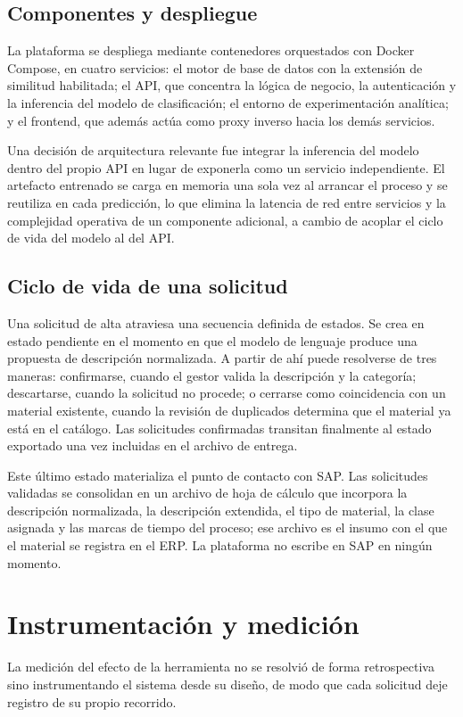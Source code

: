 \subsection{Componentes y despliegue}
La plataforma se despliega mediante contenedores orquestados con Docker Compose, en cuatro servicios: el motor de base de datos con la extensión de similitud habilitada; el API, que concentra la lógica de negocio, la autenticación y la inferencia del modelo de clasificación; el entorno de experimentación analítica; y el frontend, que además actúa como proxy inverso hacia los demás servicios.

Una decisión de arquitectura relevante fue integrar la inferencia del modelo dentro del propio API en lugar de exponerla como un servicio independiente. El artefacto entrenado se carga en memoria una sola vez al arrancar el proceso y se reutiliza en cada predicción, lo que elimina la latencia de red entre servicios y la complejidad operativa de un componente adicional, a cambio de acoplar el ciclo de vida del modelo al del API.

\subsection{Ciclo de vida de una solicitud}
Una solicitud de alta atraviesa una secuencia definida de estados. Se crea en estado pendiente en el momento en que el modelo de lenguaje produce una propuesta de descripción normalizada. A partir de ahí puede resolverse de tres maneras: confirmarse, cuando el gestor valida la descripción y la categoría; descartarse, cuando la solicitud no procede; o cerrarse como coincidencia con un material existente, cuando la revisión de duplicados determina que el material ya está en el catálogo. Las solicitudes confirmadas transitan finalmente al estado exportado una vez incluidas en el archivo de entrega.

Este último estado materializa el punto de contacto con SAP. Las solicitudes validadas se consolidan en un archivo de hoja de cálculo que incorpora la descripción normalizada, la descripción extendida, el tipo de material, la clase asignada y las marcas de tiempo del proceso; ese archivo es el insumo con el que el material se registra en el ERP. La plataforma no escribe en SAP en ningún momento.

\section{Instrumentación y medición}
La medición del efecto de la herramienta no se resolvió de forma retrospectiva sino instrumentando el sistema desde su diseño, de modo que cada solicitud deje registro de su propio recorrido.

